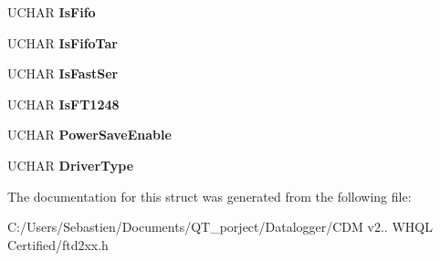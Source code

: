 \begin{DoxyCompactItemize}
U\+C\+H\+AR {\bfseries Is\+Fifo}
\item 
\mbox{\label{structft__eeprom__232h_a73d9b80c5b4c07b2085deeb4689b4371}} 
U\+C\+H\+AR {\bfseries Is\+Fifo\+Tar}
\item 
\mbox{\label{structft__eeprom__232h_ad214d1fe4bf5bf916c5364777f9dc1a8}} 
U\+C\+H\+AR {\bfseries Is\+Fast\+Ser}
\item 
\mbox{\label{structft__eeprom__232h_aa2b426719debc007b4ce6166524ca68f}} 
U\+C\+H\+AR {\bfseries Is\+F\+T1248}
\item 
\mbox{\label{structft__eeprom__232h_a60637cdb433234aa02093455605abca9}} 
U\+C\+H\+AR {\bfseries Power\+Save\+Enable}
\item 
\mbox{\label{structft__eeprom__232h_a629a028c1c415f2f9104fe7e30154039}} 
U\+C\+H\+AR {\bfseries Driver\+Type}
\end{DoxyCompactItemize}


The documentation for this struct was generated from the following file\+:\begin{DoxyCompactItemize}
\item 
C\+:/\+Users/\+Sebastien/\+Documents/\+Q\+T\+\_\+porject/\+Datalogger/\+C\+D\+M v2.. W\+H\+Q\+L Certified/ftd2xx.\+h\end{DoxyCompactItemize}
